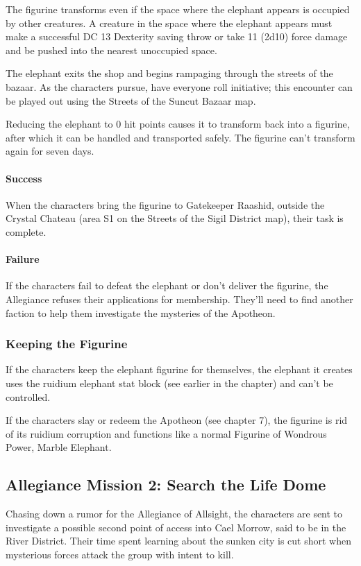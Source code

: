 \documentclass[10pt,a4paper,twoside,twocolumn,openany,nodeprecatedcode]{dndbook}
\begin{document}
The figurine transforms even if the space where the elephant appears is occupied by other creatures. A creature in the space where the elephant appears must make a successful DC 13 Dexterity saving throw or take 11 (2d10) force damage and be pushed into the nearest unoccupied space.

The elephant exits the shop and begins rampaging through the streets of the bazaar. As the characters pursue, have everyone roll initiative; this encounter can be played out using the Streets of the Suncut Bazaar map.

Reducing the elephant to 0 hit points causes it to transform back into a figurine, after which it can be handled and transported safely. The figurine can't transform again for seven days.

\paragraph{Success}
When the characters bring the figurine to Gatekeeper Raashid, outside the Crystal Chateau (area S1 on the Streets of the Sigil District map), their task is complete.

\paragraph{Failure}
If the characters fail to defeat the elephant or don't deliver the figurine, the Allegiance refuses their applications for membership. They'll need to find another faction to help them investigate the mysteries of the Apotheon.

\subsubsection{Keeping the Figurine}
If the characters keep the elephant figurine for themselves, the elephant it creates uses the ruidium elephant stat block (see earlier in the chapter) and can't be controlled.

If the characters slay or redeem the Apotheon (see chapter 7), the figurine is rid of its ruidium corruption and functions like a normal Figurine of Wondrous Power, Marble Elephant.

\subsection{Allegiance Mission 2: Search the Life Dome}
Chasing down a rumor for the Allegiance of Allsight, the characters are sent to investigate a possible second point of access into Cael Morrow, said to be in the River District. Their time spent learning about the sunken city is cut short when mysterious forces attack the group with intent to kill.
\end{document}
